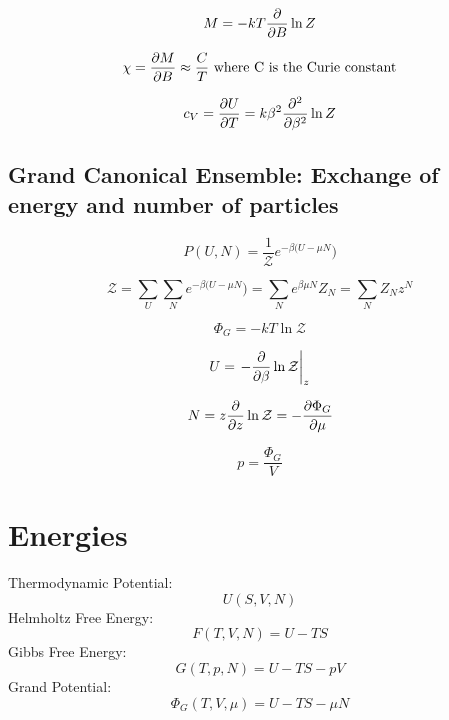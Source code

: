 \documentclass{article}
\begin{document}
\begin{equation}
	M=-kT\pdv{B}\ln Z
\end{equation}

\begin{equation}
	\chi=\pdv{M}{B}\approx\frac{C}{T}\text{   where C is the Curie constant}
\end{equation}

\begin{equation}
	c_V=\pdv{U}{T}=k\beta ^2\pdv[2]{\beta}\ln Z
\end{equation}

\subsection{Grand Canonical Ensemble: \normalfont Exchange of energy and number of particles}

\begin{equation}
	P(U,N)=\frac{1}{\mathcal{Z}}e^{-\beta(U-\mu N})
\end{equation}

\begin{equation}
	\mathcal{Z}=\sum_U \sum_N e^{-\beta(U-\mu N})=\sum_N e^{\beta\mu N}Z_N=\sum_N Z_Nz^N
\end{equation}

\begin{equation}
	\Phi_G=-kT\ln\mathcal{Z}
\end{equation}

\begin{equation}
	U=\left.-\pdv{\beta}\ln\mathcal{Z}\right\rvert_z
\end{equation}

\begin{equation}
	N=z\pdv{z}\ln\mathcal{Z}=-\pdv{\Phi_G}{\mu}
\end{equation}

\begin{equation}
	p=\frac{\Phi_G}{V}
\end{equation}

\section{Energies}

Thermodynamic Potential:
\begin{equation}
	U(S, V, N)
\end{equation}
%
Helmholtz Free Energy:
\begin{equation}
	F(T, V, N)=U-TS
\end{equation}
%
Gibbs Free Energy:
\begin{equation}
	G(T, p, N)=U-TS-pV
\end{equation}
%
Grand Potential:
\begin{equation}
	\Phi_G(T, V, \mu)=U-TS-\mu N
\end{equation}
\end{document}
